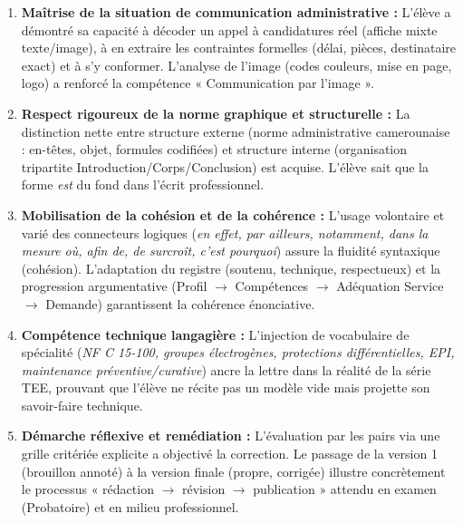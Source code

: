 \documentclass[11pt]{article}
\begin{document}
\begin{enumerate}
    \item \textbf{Maîtrise de la situation de communication administrative :} L'élève a démontré sa capacité à décoder un appel à candidatures réel (affiche mixte texte/image), à en extraire les contraintes formelles (délai, pièces, destinataire exact) et à s'y conformer. L'analyse de l'image (codes couleurs, mise en page, logo) a renforcé la compétence « Communication par l'image ».
    \item \textbf{Respect rigoureux de la norme graphique et structurelle :} La distinction nette entre structure externe (norme administrative camerounaise : en-têtes, objet, formules codifiées) et structure interne (organisation tripartite Introduction/Corps/Conclusion) est acquise. L'élève sait que la forme \emph{est} du fond dans l'écrit professionnel.
    \item \textbf{Mobilisation de la cohésion et de la cohérence :} L'usage volontaire et varié des connecteurs logiques (\textit{en effet, par ailleurs, notamment, dans la mesure où, afin de, de surcroît, c'est pourquoi}) assure la fluidité syntaxique (cohésion). L'adaptation du registre (soutenu, technique, respectueux) et la progression argumentative (Profil $\rightarrow$ Compétences $\rightarrow$ Adéquation Service $\rightarrow$ Demande) garantissent la cohérence énonciative.
    \item \textbf{Compétence technique langagière :} L'injection de vocabulaire de spécialité (\textit{NF C 15-100, groupes électrogènes, protections différentielles, EPI, maintenance préventive/curative}) ancre la lettre dans la réalité de la série TEE, prouvant que l'élève ne récite pas un modèle vide mais projette son savoir-faire technique.
    \item \textbf{Démarche réflexive et remédiation :} L'évaluation par les pairs via une grille critériée explicite a objectivé la correction. Le passage de la version 1 (brouillon annoté) à la version finale (propre, corrigée) illustre concrètement le processus « rédaction $\rightarrow$ révision $\rightarrow$ publication » attendu en examen (Probatoire) et en milieu professionnel.
\end{enumerate}
\end{document}
